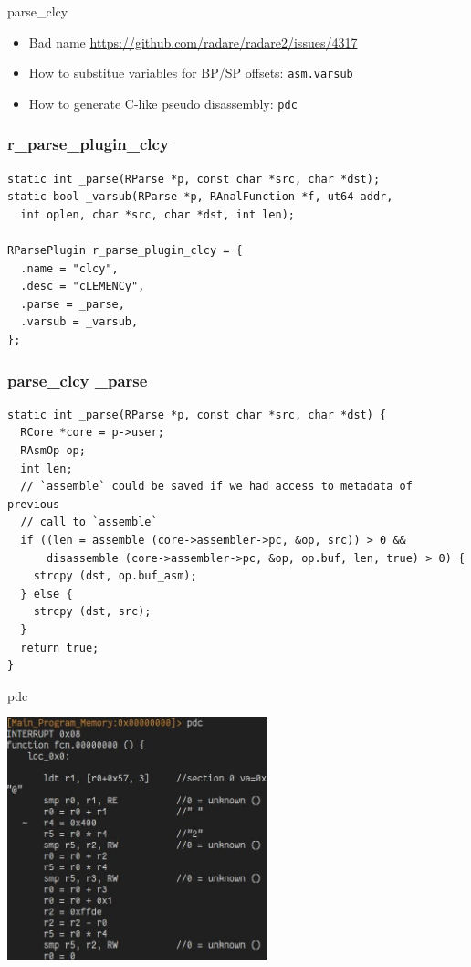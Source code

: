 \documentclass{beamer}
\begin{document}
\begin{frame}{parse\_clcy}
  \begin{itemize}
  \item Bad name \url{https://github.com/radare/radare2/issues/4317}
  \item How to substitue variables for BP/SP offsets: \texttt{asm.varsub}
  \item How to generate C-like pseudo disassembly: \texttt{pdc}
  \end{itemize}
\end{frame}

\begin{frame}[fragile]
  \frametitle{r\_parse\_plugin\_clcy}
  \scriptsize
  \begin{verbatim}
static int _parse(RParse *p, const char *src, char *dst);
static bool _varsub(RParse *p, RAnalFunction *f, ut64 addr,
  int oplen, char *src, char *dst, int len);

RParsePlugin r_parse_plugin_clcy = {
  .name = "clcy",
  .desc = "cLEMENCy",
  .parse = _parse,
  .varsub = _varsub,
};
  \end{verbatim}
\end{frame}

\begin{frame}[fragile]
  \frametitle{parse\_clcy \_parse}
  \scriptsize
  \begin{verbatim}
static int _parse(RParse *p, const char *src, char *dst) {
  RCore *core = p->user;
  RAsmOp op;
  int len;
  // `assemble` could be saved if we had access to metadata of previous
  // call to `assemble`
  if ((len = assemble (core->assembler->pc, &op, src)) > 0 &&
      disassemble (core->assembler->pc, &op, op.buf, len, true) > 0) {
    strcpy (dst, op.buf_asm);
  } else {
    strcpy (dst, src);
  }
  return true;
}
  \end{verbatim}
\end{frame}

\begin{frame}{pdc}
  \begin{center}
    \includegraphics[height=7cm]{pdc.jpg}
  \end{center}
\end{frame}
\end{document}
